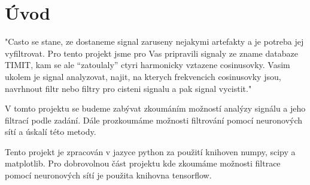 \section{Úvod}

"Casto se stane, ze dostaneme signal zaruseny nejakymi artefakty a je potreba jej vyfiltrovat. Pro tento projekt 
jsme pro Vas pripravili signaly ze zname databaze TIMIT, kam se ale “zatoulaly” ctyri harmonicky vztazene
cosinusovky. Vasim ukolem je signal analyzovat, najit, na kterych frekvencich cosinusovky jsou, navrhnout filtr
nebo filtry pro cisteni signalu a pak signal vycistit."

V tomto projektu se budeme zabývat zkoumáním možností analýzy signálu a jeho filtrací podle zadání.
Dále prozkoumáme možnosti filtrování pomocí neuronových sítí a úskalí této metody.

Tento projekt je zpracován v jazyce python za použití knihoven numpy, scipy a matplotlib. Pro dobrovolnou část projektu kde zkoumáme možnosti filtrace pomocí neuronových sítí je použita knihovna tensorflow.